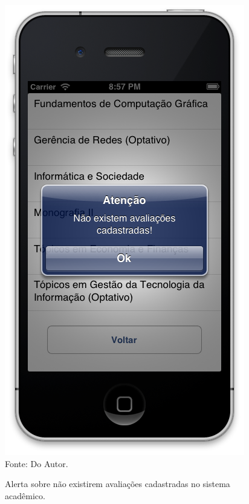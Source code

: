 \begin{figure}[!htb]
     \centering
     \caption[Formulário Notas da Graduação - Inexistência de Avaliações]{Alerta sobre não existirem avaliações cadastradas no sistema acadêmico.}
     \includegraphics[scale=0.5]{imagens/alertanaoexistemavaliacoes.png}
     \\  Fonte: Do Autor.
\end{figure}
\newpage


